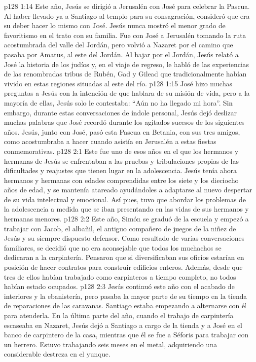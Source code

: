 \vs p128 1:14 \pc Este año, Jesús se dirigió a Jerusalén con José para celebrar la Pascua. Al haber llevado ya a Santiago al templo para su consagración, consideró que era su deber hacer lo mismo con José. Jesús nunca mostró el menor grado de favoritismo en el trato con su familia. Fue con José a Jerusalén tomando la ruta acostumbrada del valle del Jordán, pero volvió a Nazaret por el camino que pasaba por Amatus, al este del Jordán. Al bajar por el Jordán, Jesús relató a José la historia de los judíos y, en el viaje de regreso, le habló de las experiencias de las renombradas tribus de Rubén, Gad y Gilead que tradicionalmente habían vivido en estas regiones situadas al este del río.
\vs p128 1:15 José hizo muchas preguntas a Jesús con la intención de que hablara de su misión de vida, pero a la mayoría de ellas, Jesús solo le contestaba: “Aún no ha llegado mi hora”. Sin embargo, durante estas conversaciones de índole personal, Jesús dejó deslizar muchas palabras que José recordó durante los agitados sucesos de los siguientes años. Jesús, junto con José, pasó esta Pascua en Betania, con sus tres amigos, como acostumbraba a hacer cuando asistía en Jerusalén a estas fiestas conmemorativas.
\vs p128 2:1 Este fue uno de esos años en el que los hermanos y hermanas de Jesús se enfrentaban a las pruebas y tribulaciones propias de las dificultades y reajustes que tienen lugar en la adolescencia. Jesús tenía ahora hermanos y hermanas con edades comprendidas entre los siete y los dieciocho años de edad, y se mantenía atareado ayudándoles a adaptarse al nuevo despertar de su vida intelectual y emocional. Así pues, tuvo que abordar los problemas de la adolescencia a medida que se iban presentando en las vidas de sus hermanos y hermanas menores.
\vs p128 2:2 Este año, Simón se graduó de la escuela y empezó a trabajar con Jacob, el albañil, el antiguo compañero de juegos de la niñez de Jesús y su siempre dispuesto defensor. Como resultado de varias conversaciones familiares, se decidió que no era aconsejable que todos los muchachos se dedicaran a la carpintería. Pensaron que si diversificaban sus oficios estarían en posición de hacer contratos para construir edificios enteros. Además, desde que tres de ellos habían trabajado como carpinteros a tiempo completo, no todos habían estado ocupados.
\vs p128 2:3 Jesús continuó este año con el acabado de interiores y la ebanistería, pero pasaba la mayor parte de su tiempo en la tienda de reparaciones de las caravanas. Santiago estaba empezando a alternarse con él para atenderla. En la última parte del año, cuando el trabajo de carpintería escaseaba en Nazaret, Jesús dejó a Santiago a cargo de la tienda y a José en el banco de carpintero de la casa, mientras que él se fue a Séforis para trabajar con un herrero. Estuvo trabajando seis meses en el metal, adquiriendo una considerable destreza en el yunque.
